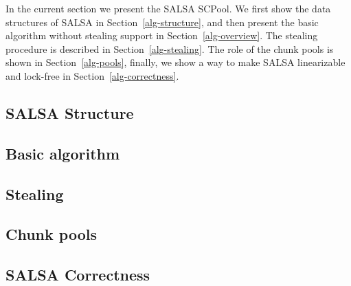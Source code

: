 In the current section we present the SALSA SCPool. We first show the data structures of SALSA in Section~\ref{alg-structure}, and then present the basic algorithm without stealing support in Section~\ref{alg-overview}. The stealing procedure is described in Section~\ref{alg-stealing}. The role of the chunk pools is shown in Section~\ref{alg-pools}, finally, we show a way to make SALSA linearizable and lock-free in Section~\ref{alg-correctness}. 

\subsection{SALSA Structure\label{alg-structure}}

\subsection{Basic algorithm\label{alg-overview}}

\subsection{Stealing\label{alg-stealing}}

\subsection{Chunk pools\label{alg-pools}}

\subsection{SALSA Correctness\label{alg-correctness}}
